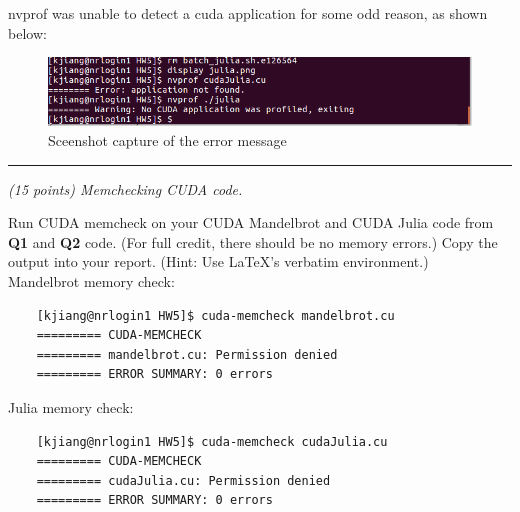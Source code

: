 \documentclass{article}
\newcommand{\myhrule}{ \begin{center}\rule{.9\linewidth}{.25mm}\end{center} }
\newcommand{\pad}{\vspace{8pt}\noindent}
\begin{document}
nvprof was unable to detect a cuda application for some odd reason, as shown below:
\begin{figure}[h!]
    \centering
    \includegraphics[scale=1]{nvprof_error.png}
    \caption{Sceenshot capture of the error message}
    \label{fig:nvprof_error}
\end{figure}

\myhrule

\pad {\bf Q4} {\it (15 points) Memchecking CUDA code.}
\vspace{8pt} 

\noindent Run CUDA memcheck on your CUDA Mandelbrot and CUDA Julia code from \textbf{Q1} and \textbf{Q2} code. (For full credit, there should be no memory errors.) Copy the output into your report. (Hint: Use \LaTeX{}'s verbatim environment.) \\

Mandelbrot memory check:
\begin{verbatim}
    [kjiang@nrlogin1 HW5]$ cuda-memcheck mandelbrot.cu
    ========= CUDA-MEMCHECK
    ========= mandelbrot.cu: Permission denied
    ========= ERROR SUMMARY: 0 errors
\end{verbatim}

Julia memory check:
\begin{verbatim}
    [kjiang@nrlogin1 HW5]$ cuda-memcheck cudaJulia.cu 
    ========= CUDA-MEMCHECK
    ========= cudaJulia.cu: Permission denied
    ========= ERROR SUMMARY: 0 errors
\end{verbatim}



\end{document}
